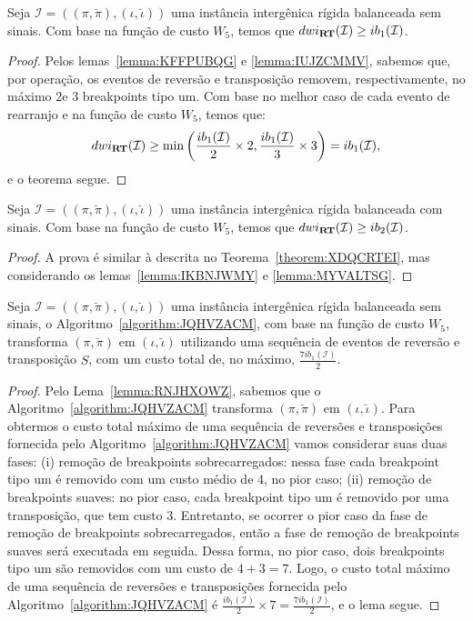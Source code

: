 \begin{theorem}\label{theorem:XDQCRTEI}
Seja $\mathcal{I} = ((\pi,\breve\pi),(\iota,\breve\iota))$ uma instância intergênica rígida balanceada sem sinais. Com base na função de custo $W_5$, temos que $dwi_{\textbf{RT}}(\mathcal{I}) \ge ib_1(\mathcal{I})$.
\begin{proof}
Pelos lemas~\ref{lemma:KFFPUBQG} e \ref{lemma:IUJZCMMV}, sabemos que, por operação, os eventos de reversão e transposição removem, respectivamente, no máximo $2$e $3$ breakpoints tipo um. Com base no melhor caso de cada evento de rearranjo e na função de custo $W_5$, temos que:
$$dwi_{\textbf{RT}}(\mathcal{I}) \ge \min\left(\frac{ib_1(\mathcal{I})}{2} \times 2,\frac{ib_1(\mathcal{I})}{3} \times 3\right) = ib_1(\mathcal{I}),$$ e o teorema segue.
\end{proof}
\end{theorem}

\begin{theorem}\label{theorem:MCKFPIOP}
Seja $\mathcal{I} = ((\pi,\breve\pi),(\iota,\breve\iota))$ uma instância intergênica rígida balanceada com sinais. Com base na função de custo $W_5$, temos que $dwi_{\textbf{RT}}(\mathcal{I}) \ge ib_2(\mathcal{I})$.
\begin{proof}
A prova é similar à descrita no Teorema~\ref{theorem:XDQCRTEI}, mas considerando os lemas~\ref{lemma:IKBNJWMY} e \ref{lemma:MYVALTSG}.
\end{proof}
\end{theorem}

\begin{lemma}\label{lemma:ODPHCEIG}
Seja $\mathcal{I} = ((\pi,\breve\pi),(\iota,\breve\iota))$ uma instância intergênica rígida balanceada sem sinais, o Algoritmo~\ref{algorithm:JQHVZACM}, com base na função de custo $W_5$, transforma $(\pi,\breve\pi)$ em $(\iota,\breve\iota)$ utilizando uma sequência de eventos de reversão e transposição $S$, com um custo total de, no máximo, $\frac{7ib_1(\mathcal{I})}{2}$.
\end{lemma}
\begin{proof}
Pelo Lema~\ref{lemma:RNJHXOWZ}, sabemos que o Algoritmo~\ref{algorithm:JQHVZACM} transforma $(\pi,\breve\pi)$ em $(\iota,\breve\iota)$. Para obtermos o custo total máximo de uma sequência de reversões e transposições fornecida pelo Algoritmo~\ref{algorithm:JQHVZACM} vamos considerar suas duas fases: (i) remoção de breakpoints sobrecarregados: nessa fase cada breakpoint tipo um é removido com um custo médio de $4$, no pior caso; (ii) remoção de breakpoints suaves: no pior caso, cada breakpoint tipo um é removido por uma transposição, que tem custo $3$. Entretanto, se ocorrer o pior caso da fase de remoção de breakpoints sobrecarregados, então a fase de remoção de breakpoints suaves será executada em seguida. Dessa forma, no pior caso, dois breakpoints tipo um são removidos com um custo de $4 + 3 = 7$. Logo, o custo total máximo de uma sequência de reversões e transposições fornecida pelo Algoritmo~\ref{algorithm:JQHVZACM} é $\frac{ib_1(\mathcal{I})}{2} \times 7 = \frac{7ib_1(\mathcal{I})}{2}$, e o lema segue. 
\end{proof}


